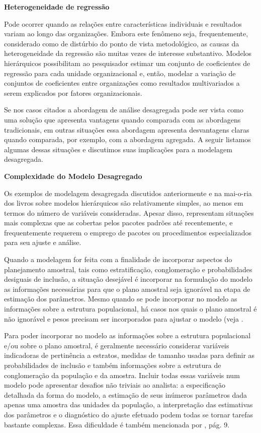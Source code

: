 \documentclass[]{book}
\theoremstyle{definition}
\theoremstyle{definition}
\theoremstyle{definition}
\theoremstyle{remark}
\begin{document}
\textbf{Heterogeneidade de regressão}

Pode ocorrer quando as relações entre características individuais e
resultados variam ao longo das organizações. Embora este fenômeno seja,
frequentemente, considerado como de distúrbio do ponto de vista
metodológico, as causas da heterogeneidade da regressão são muitas vezes
de interesse substantivo. Modelos hierárquicos possibilitam ao
pesquisador estimar um conjunto de coeficientes de regressão para cada
unidade organizacional e, então, modelar a variação de conjuntos de
coeficientes entre organizações como resultados multivariados a serem
explicados por fatores organizacionais.

Se nos casos citados a abordagem de análise desagregada pode ser vista
como uma solução que apresenta vantagens quando comparada com as
abordagens tradicionais, em outras situações essa abordagem apresenta
desvantagens claras quando comparada, por exemplo, com a abordagem
agregada. A seguir listamos algumas dessas situações e discutimos suas
implicações para a modelagem desagregada.

\textbf{Complexidade do Modelo Desagregado}

Os exemplos de modelagem desagregada discutidos anteriormente e na
mai-o-ria dos livros sobre modelos hierárquicos são relativamente
simples, ao menos em termos do número de variáveis consideradas. Apesar
disso, representam situações mais complexas que as cobertas pelos
pacotes padrões até recentemente, e frequentemente requerem o emprego de
pacotes ou procedimentos especializados para seu ajuste e análise.

Quando a modelagem for feita com a finalidade de incorporar aspectos do
planejamento amostral, tais como estratificação, conglomeração e
probabilidades desiguais de inclusão, a situação desejável é incorporar
na formulação do modelo as informações necessárias para que o plano
amostral seja ignorável na etapa de estimação dos parâmetros. Mesmo
quando se pode incorporar no modelo as informações sobre a estrutura
populacional, há casos nos quais o plano amostral é não ignorável e
pesos precisam ser incorporados para ajustar o modelo (veja
\citep{Pfefetalli}.

Para poder incorporar no modelo as informações sobre a estrutura
populacional e/ou sobre o plano amostral, é geralmente necessário
considerar variáveis indicadoras de pertinência a estratos, medidas de
tamanho usadas para definir as probabilidades de inclusão e também
informações sobre a estrutura de conglomeração da população e da
amostra. Incluir todas essas variáveis num modelo pode apresentar
desafios não triviais ao analista: a especificação detalhada da forma do
modelo, a estimação de seus inúmeros parâmetros dada apenas uma amostra
das unidades da população, a interpretação das estimativas dos
parâmetros e o diagnóstico do ajuste efetuado podem todas se tornar
tarefas bastante complexas. Essa dificuldade é também mencionada por
\citep{Sk89a}, pág. 9.
\end{document}
